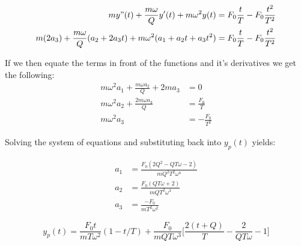 \begin{align*}
    m y"(t)+ \frac{m \omega}{Q} y'(t) + m \omega^2 y(t) &= F_0 \frac{t}{T} -F_0 \frac{t^2}{T^2}\\
    m (2a_3) + \frac{m \omega}{Q} (a_2 +2a_3 t) + m \omega^2 (a_1 + a_2 t + a_3t^2) &= F_0 \frac{t}{T} -F_0 \frac{t^2}{T^2}
\end{align*}

If we then equate the terms in front of the functions and it's derivatives we get the following:\\
\begin{align*}
    m\omega^2 a_1 + \frac{m \omega a_2}{Q} + 2ma_3 &= 0\\
    m \omega^2 a_2 + \frac{2m\omega a_3}{Q} &= \frac{F_0}{T}\\
    m \omega^2 a_3 &= -\frac{F_0}{T^2}
\end{align*}

Solving the system of equations and substituting back into $y_p(t)$ yields:

\begin{align*}
    a_1 &= \frac{F_0 ( 2Q^2 -Q T\omega -2)}{mQ^2 T^2 \omega^4}\\
    a_2 &= \frac{F_0 ( QT\omega +2)}{mQT^2\omega^3}\\
    a_3 &= \frac{-F_0}{mT^2 \omega^2}
\end{align*}

\begin{equation}
    y_p(t)=\frac{F_0 t}{mT\omega^2}(1-t/T)+\frac{F_0}{mQT\omega^3}\biggl[\frac{2(t+Q)}{T}-\frac{2}{QT\omega}-1\biggr]
\end{equation}